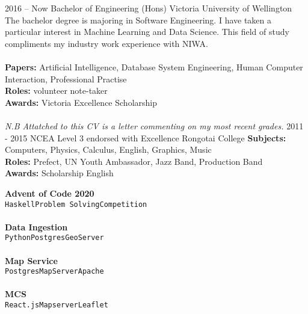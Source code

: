 \documentclass[9pt]{developercv}
\begin{document}


\begin{entrylist}
	\entry
		{2016 -- Now}
		{Bachelor of Engineering (Hons)}
		{Victoria University of Wellington}
		{
			The bachelor degree is majoring in Software Engineering. I have taken a particular interest in Machine Learning and Data Science. This field of study compliments my industry work experience with NIWA.
			\\\\
			\textbf{Papers:} Artificial Intelligence, Database System Engineering, Human Computer Interaction, Professional Practise \\
			\textbf{Roles:} volunteer note-taker \\
			\textbf{Awards:} Victoria Excellence Scholarship \\\\
			\emph{N.B Attatched to this CV is a letter commenting on my most recent grades.}
		}
	\entry
		{2011 - 2015}
		{NCEA Level 3 endorsed with Excellence}
		{Rongotai College}
		{
			\textbf{Subjects:} Computers, Physics, Calculus, English, Graphics, Music \\
			\textbf{Roles:} Prefect, UN Youth Ambassador, Jazz Band, Production Band \\
			\textbf{Awards:} Scholarship English
		}
\end{entrylist}



{
	{\textbf{Advent of Code 2020}}
	\\
	{\texttt{Haskell}\slashsep\texttt{Problem Solving}\slashsep\texttt{Competition}}
	\\\\
}
{
	{\textbf{Data Ingestion}}
	\\
	{\texttt{Python}\slashsep\texttt{Postgres}\slashsep\texttt{GeoServer}}
	\\\\
}
{
	{\textbf{Map Service}}
	\\
	{\texttt{Postgres}\slashsep\texttt{MapServer}\slashsep\texttt{Apache}}
	\\\\
}
{
	{\textbf{MCS}}
	\\
	{\texttt{React.js}\slashsep\texttt{Mapserver}\slashsep\texttt{Leaflet}}
}
\end{document}
